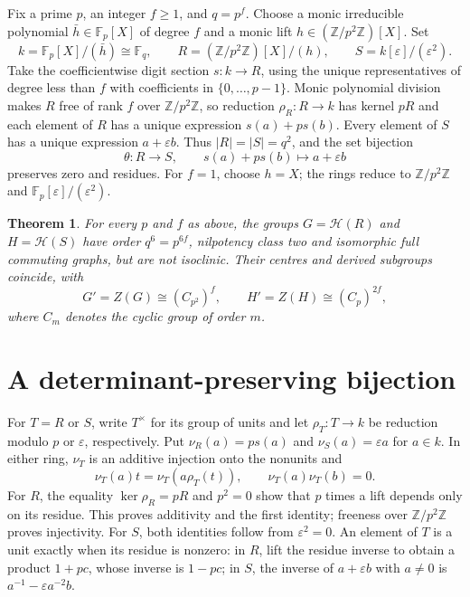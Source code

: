 \documentclass[11pt]{article}
\newtheorem{theorem}{Theorem}
\newcommand{\Fp}{\mathbb F_p}
\newcommand{\HH}{\mathcal H}
\newcommand{\ZZ}{\mathbb Z}
\begin{document}
Fix a prime $p$, an integer $f\geq1$, and $q=p^f$.
Choose a monic irreducible polynomial $\bar h\in\Fp[X]$ of degree $f$
and a monic lift $h\in(\ZZ/p^2\ZZ)[X]$. Set
\[
 k=\Fp[X]/(\bar h)\cong\mathbb F_q,\qquad
 R=(\ZZ/p^2\ZZ)[X]/(h),\qquad
 S=k[\varepsilon]/(\varepsilon^2).
\]
Take the coefficientwise digit section $s:k\to R$, using the unique
representatives of degree less than $f$ with coefficients in
$\{0,\ldots,p-1\}$. Monic polynomial division makes $R$ free of rank $f$
over $\ZZ/p^2\ZZ$, so reduction $\rho_R:R\to k$ has kernel $pR$
and each element of $R$ has a unique expression $s(a)+ps(b)$.
Every element of $S$ has a unique expression $a+\varepsilon b$.
Thus $|R|=|S|=q^2$, and the set bijection
\begin{equation}\label{eq:theta}
 \theta:R\longrightarrow S,\qquad s(a)+ps(b)\longmapsto a+\varepsilon b
\end{equation}
preserves zero and residues. For $f=1$, choose $h=X$; the rings reduce
to $\ZZ/p^2\ZZ$ and $\Fp[\varepsilon]/(\varepsilon^2)$.

\begin{theorem}\label{thm:main}
For every $p$ and $f$ as above, the groups $G=\HH(R)$ and $H=\HH(S)$ have order
$q^6=p^{6f}$, nilpotency class two and isomorphic full commuting graphs, but are
not isoclinic. Their centres and derived subgroups coincide, with
\[
 G'=Z(G)\cong (C_{p^2})^f,\qquad H'=Z(H)\cong (C_p)^{2f},
\]
where $C_m$ denotes the cyclic group of order $m$.
\end{theorem}

\section{A determinant-preserving bijection}
For $T=R$ or $S$, write $T^\times$ for its group of units and let
$\rho_T:T\to k$ be reduction modulo $p$ or
$\varepsilon$, respectively. Put $\nu_R(a)=ps(a)$ and
$\nu_S(a)=\varepsilon a$ for $a\in k$.
In either ring, $\nu_T$ is an additive injection onto the nonunits and
\begin{equation}\label{eq:nil}
 \nu_T(a)t=\nu_T(a\rho_T(t)),\qquad
 \nu_T(a)\nu_T(b)=0.
\end{equation}
For $R$, the equality $\ker\rho_R=pR$ and $p^2=0$ show that
$p$ times a lift depends only on its residue. This proves additivity and
the first identity; freeness over $\ZZ/p^2\ZZ$ proves injectivity.
For $S$, both identities follow from $\varepsilon^2=0$.
An element of $T$ is a unit exactly when its residue is nonzero:
in $R$, lift the residue inverse to obtain a product $1+pc$, whose inverse
is $1-pc$; in $S$, the inverse of $a+\varepsilon b$ with $a\ne0$ is
$a^{-1}-\varepsilon a^{-2}b$.
\end{document}
